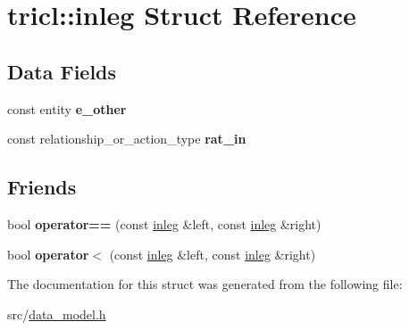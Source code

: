 \hypertarget{structtricl_1_1inleg}{}\section{tricl\+:\+:inleg Struct Reference}
\label{structtricl_1_1inleg}
\subsection*{Data Fields}
\begin{DoxyCompactItemize}
\item 
\mbox{\label{structtricl_1_1inleg_aacd096c1b1998b321f19b973db55aec2}} 
const entity {\bfseries e\+\_\+other}
\item 
\mbox{\label{structtricl_1_1inleg_aa0bf7ed4910869446d610bf75d05fc34}} 
const relationship\+\_\+or\+\_\+action\+\_\+type {\bfseries rat\+\_\+in}
\end{DoxyCompactItemize}
\subsection*{Friends}
\begin{DoxyCompactItemize}
\item 
\mbox{\label{structtricl_1_1inleg_a2882c00597e94a9fb19cde857cfe5003}} 
bool {\bfseries operator==} (const \hyperlink{structtricl_1_1inleg}{inleg} \&left, const \hyperlink{structtricl_1_1inleg}{inleg} \&right)
\item 
\mbox{\label{structtricl_1_1inleg_a8ddd31813cdcbb1b7c88d51fcd01cd23}} 
bool {\bfseries operator$<$} (const \hyperlink{structtricl_1_1inleg}{inleg} \&left, const \hyperlink{structtricl_1_1inleg}{inleg} \&right)
\end{DoxyCompactItemize}


The documentation for this struct was generated from the following file\+:\begin{DoxyCompactItemize}
\item 
src/\hyperlink{data__model_8h}{data\+\_\+model.\+h}\end{DoxyCompactItemize}
